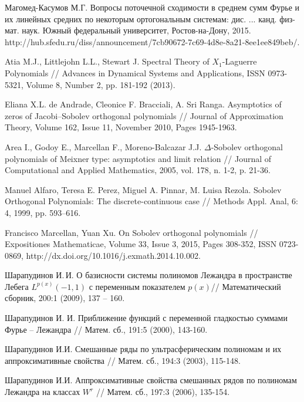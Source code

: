 \begin{thebibliography}{111}
Магомед-Касумов М.Г. Вопросы поточечной сходимости в среднем сумм Фурье и их линейных средних по некоторым ортогональным системам: дис. ... канд. физ-мат. наук. Южный федеральный университет, Ростов-на-Дону, 2015.	http://hub.sfedu.ru/diss/announcement/7cb90672-7c69-4d8e-8a21-8ee1ee849beb/.


Atia M.J., Littlejohn L.L., Stewart J. Spectral Theory of $X_1$-Laguerre Polynomials // Advances in Dynamical Systems and Applications, ISSN 0973-5321, Volume 8, Number 2, pp. 181-192 (2013).




Eliana X.L. de Andrade, Cleonice F. Bracciali, A. Sri Ranga. Asymptotics of zeros of Jacobi–Sobolev orthogonal polynomials // Journal of Approximation Theory, Volume 162, Issue 11, November 2010, Pages 1945-1963.




Area I., Godoy E., Marcellan F., Moreno-Balcazar J.J. $\Delta$-Sobolev orthogonal polynomials of Meixner type: asymptotics and limit relation // Journal of Computational and Applied Mathematics, 2005, vol. 178, n. 1-2, p. 21-36.




Manuel Alfaro, Teresa E. Perez, Miguel A. Pinnar, M. Luisa Rezola. Sobolev Orthogonal Polynomials: The discrete-continuous case // Methods Appl. Anal, 6: 4, 1999, pp. 593--616.




Francisco Marcellan, Yuan Xu. On Sobolev orthogonal polynomials // Expositiones Mathematicae, Volume 33, Issue 3, 2015, Pages 308-352, ISSN 0723-0869, http://dx.doi.org/10.1016/j.exmath.2014.10.002.

Шарапудинов И.\,И. О базисности системы полиномов Лежандра в пространстве Лебега $L^{p(x)}(-1,1)$ с переменным показателем $p(x)$// Математический сборник, 200:1 (2009), 137 -- 160.

Шарапудинов И. И. Приближение функций с переменной гладкостью суммами Фурье -- Лежандра // Матем. сб., 191:5 (2000), 143-160.




Шарапудинов И.И. Смешанные ряды по ультрасферическим полиномам и их аппроксимативные свойства // Матем. сб., 194:3 (2003), 115-148.




Шарапудинов И.И. Аппроксимативные свойства смешанных рядов по полиномам Лежандра на классах $W^r$ // Матем. сб., 197:3 (2006), 135-154.



\end{thebibliography}
